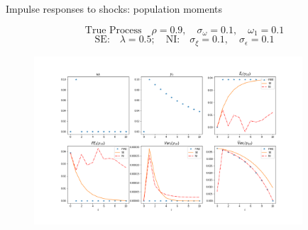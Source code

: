 \documentclass{beamer}
\begin{document}
\begin{frame}{Impulse responses to shocks: population moments}


$$\textrm{True Process} \quad   \rho=0.9, \quad \sigma_\omega= 0.1, \quad \omega_1 = 0.1$$
$$ \textrm{SE:} \quad  \lambda = 0.5; \quad \textrm{NI:} \quad \sigma_\xi = 0.1, \quad \sigma_\epsilon = 0.1$$

\begin{figure}
	\includegraphics[height=6.3cm,width=10cm]{figures/ir_popseni} 
\end{figure}

\end{frame}


\end{document}
